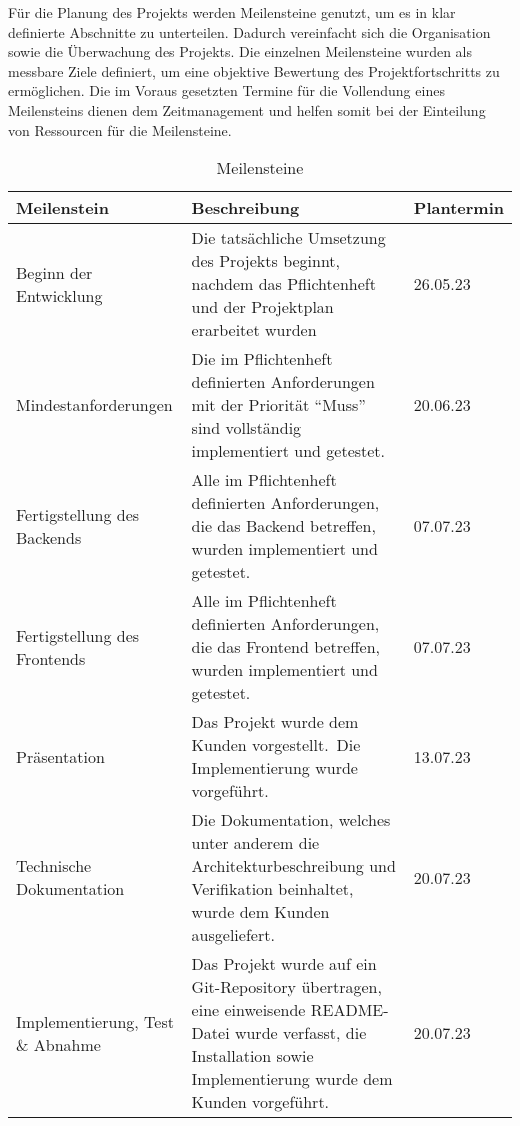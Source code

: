 Für die Planung des Projekts werden Meilensteine genutzt, um es in klar definierte Abschnitte zu unterteilen.
Dadurch vereinfacht sich die Organisation sowie die Überwachung des Projekts.
Die einzelnen Meilensteine wurden als messbare Ziele definiert,
um eine objektive Bewertung des Projektfortschritts zu ermöglichen.
Die im Voraus gesetzten Termine für die Vollendung eines Meilensteins dienen dem Zeitmanagement und helfen somit
bei der Einteilung von Ressourcen für die Meilensteine.

\begin{table} [H]
    \centering
    \begin{tabularx}{\textwidth}{|m{3.5cm}|X|P{2cm}|}
        \hline
        Meilenstein & Beschreibung & Plantermin \\
        \hline
        Beginn der \newline Entwicklung & Die tatsächliche Umsetzung des Projekts beginnt, nachdem das Pflichtenheft
        und der Projektplan erarbeitet wurden & 26.05.23 \\
        \hline
        Mindestanforderungen & Die im Pflichtenheft definierten Anforderungen mit der Priorität
        \enquote{Muss} sind vollständig implementiert und getestet.\ & 20.06.23 \\
        \hline
        Fertigstellung des \newline Backends & Alle im Pflichtenheft definierten Anforderungen,
        die das Backend betreffen, wurden implementiert und getestet.\ & 07.07.23 \\
        \hline
        Fertigstellung des \newline Frontends & Alle im Pflichtenheft definierten Anforderungen,
        die das Frontend betreffen, wurden implementiert und getestet.\ & 07.07.23 \\
        \hline
        Präsentation & Das Projekt wurde dem Kunden vorgestellt.\ Die Implementierung wurde vorgeführt.\   & 13.07.23 \\
        \hline
        Technische \newline Dokumentation & Die Dokumentation, welches unter anderem die Architekturbeschreibung und
        Verifikation beinhaltet, wurde dem Kunden ausgeliefert.\ & 20.07.23 \\
        \hline
        Implementierung, \newline Test \& Abnahme & Das Projekt wurde auf ein Git-Repository übertragen,
        eine einweisende README-Datei wurde verfasst, die Installation sowie Implementierung wurde dem Kunden vorgeführt.\ & 20.07.23 \\
        \hline
    \end{tabularx}
    \caption{Meilensteine}
    \label{tab:meilensteine}
\end{table}
